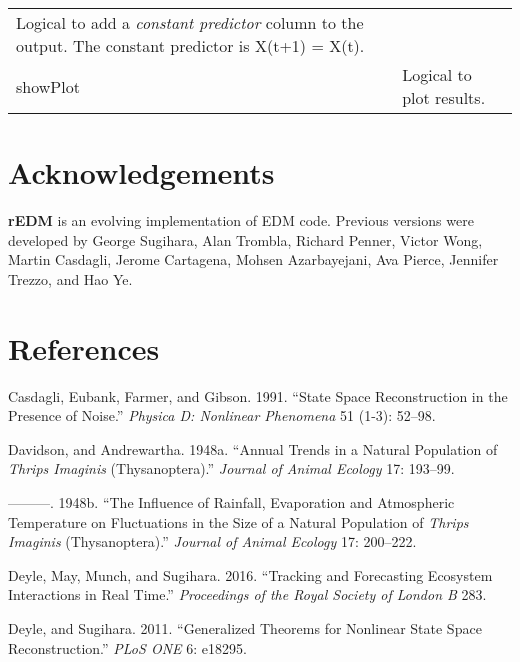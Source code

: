 \documentclass[]{article}
\begin{document}
\begin{longtable}[]{@{}ll@{}}
\begin{minipage}[t]{0.85\columnwidth}
Logical to add a \emph{constant predictor} column to the output. The
constant predictor is X(t+1) = X(t).\strut
\end{minipage}\tabularnewline
\begin{minipage}[t]{0.09\columnwidth}\raggedright
showPlot\strut
\end{minipage} & \begin{minipage}[t]{0.85\columnwidth}\raggedright
Logical to plot results.\strut
\end{minipage}\tabularnewline
\bottomrule
\end{longtable}

\hypertarget{acknowledgements}{%
\section{Acknowledgements}\label{acknowledgements}}

\textbf{rEDM} is an evolving implementation of EDM code. Previous
versions were developed by George Sugihara, Alan Trombla, Richard
Penner, Victor Wong, Martin Casdagli, Jerome Cartagena, Mohsen
Azarbayejani, Ava Pierce, Jennifer Trezzo, and Hao Ye.

\hypertarget{references}{%
\section{References}\label{references}}

\hypertarget{refs}{}
\leavevmode\hypertarget{ref-Casdagli_1991}{}%
Casdagli, Eubank, Farmer, and Gibson. 1991. ``State Space Reconstruction
in the Presence of Noise.'' \emph{Physica D: Nonlinear Phenomena} 51
(1-3): 52--98.

\leavevmode\hypertarget{ref-Davidson_1948}{}%
Davidson, and Andrewartha. 1948a. ``Annual Trends in a Natural
Population of \emph{Thrips Imaginis} (Thysanoptera).'' \emph{Journal of
Animal Ecology} 17: 193--99.

\leavevmode\hypertarget{ref-Davidson_1948a}{}%
---------. 1948b. ``The Influence of Rainfall, Evaporation and
Atmospheric Temperature on Fluctuations in the Size of a Natural
Population of \emph{Thrips Imaginis} (Thysanoptera).'' \emph{Journal of
Animal Ecology} 17: 200--222.

\leavevmode\hypertarget{ref-Deyle_2016}{}%
Deyle, May, Munch, and Sugihara. 2016. ``Tracking and Forecasting
Ecosystem Interactions in Real Time.'' \emph{Proceedings of the Royal
Society of London B} 283.

\leavevmode\hypertarget{ref-Deyle_2011}{}%
Deyle, and Sugihara. 2011. ``Generalized Theorems for Nonlinear State
Space Reconstruction.'' \emph{PLoS ONE} 6: e18295.
\end{document}
